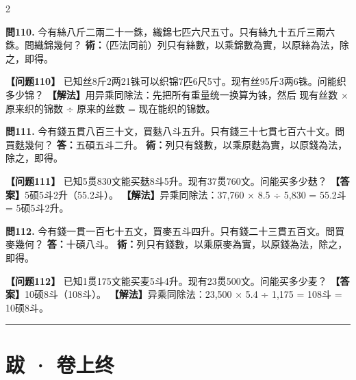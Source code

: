 \documentclass[11pt,a4paper]{article}
\newcommand{\longline}{\noindent\rule{\textwidth}{0.4pt}}
\begin{document}
\begin{paracol}{2}
\switchcolumn*

\textbf{問110.} 今有絲八斤二兩二十一銖，織錦七匹六尺五寸。只有絲九十五斤三兩六銖。問織錦幾何？\break
\textbf{術：}（匹法同前）列只有絲數，以乘錦數為實，以原絲為法，除之，即得。

\switchcolumn

\textbf{【问题110】} 已知丝8斤2两21铢可以织锦7匹6尺5寸。现有丝95斤3两6铢。问能织多少锦？\break
\textbf{【解法】}用异乘同除法：先把所有重量统一换算为铢，然后\break
现有丝数 × 原来织的锦数 ÷ 原来的丝数 = 现在能织的锦数。

\switchcolumn*

\textbf{問111.} 今有錢五貫八百三十文，買麩八斗五升。只有錢三十七貫七百六十文。問買麩幾何？\break
\textbf{答：}五碩五斗二升。\break
\textbf{術：}列只有錢數，以乘原麩為實，以原錢為法，除之，即得。

\switchcolumn

\textbf{【问题111】} 已知5贯830文能买麸8斗5升。现有37贯760文。问能买多少麸？\break
\textbf{【答案】}5硕5斗2升（55.2斗）。\break
\textbf{【解法】}异乘同除法：37,760 × 8.5 ÷ 5,830 = 55.2斗 = 5硕5斗2升。

\switchcolumn*

\textbf{問112.} 今有錢一貫一百七十五文，買麥五斗四升。只有錢二十三貫五百文。問買麥幾何？\break
\textbf{答：}十碩八斗。\break
\textbf{術：}列只有錢數，以乘原麥為實，以原錢為法，除之，即得。

\switchcolumn

\textbf{【问题112】} 已知1贯175文能买麦5斗4升。现有23贯500文。问能买多少麦？\break
\textbf{【答案】}10硕8斗（108斗）。\break
\textbf{【解法】}异乘同除法：23,500 × 5.4 ÷ 1,175 = 108斗 = 10硕8斗。

\end{paracol}

\vspace{1cm}
\longline

\section*{跋 · 卷上终}
\end{document}
